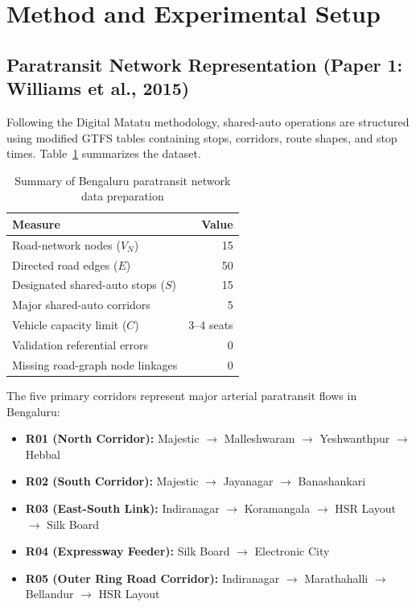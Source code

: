 \section{Method and Experimental Setup}

\subsection{Paratransit Network Representation (Paper 1: Williams et al., 2015)}
Following the Digital Matatu methodology, shared-auto operations are structured using modified GTFS tables containing stops, corridors, route shapes, and stop times. Table~\ref{tab:paratransit-data-summary} summarizes the dataset.

\begin{table}[htbp]
\centering
\caption{Summary of Bengaluru paratransit network data preparation}
\label{tab:paratransit-data-summary}
\begin{tabular}{lr}
\toprule
\textbf{Measure} & \textbf{Value}\\
\midrule
Road-network nodes ($V_N$) & 15\\
Directed road edges ($E$) & 50\\
Designated shared-auto stops ($S$) & 15\\
Major shared-auto corridors & 5\\
Vehicle capacity limit ($C$) & 3--4 seats\\
Validation referential errors & 0\\
Missing road-graph node linkages & 0\\
\bottomrule
\end{tabular}
\end{table}

The five primary corridors represent major arterial paratransit flows in Bengaluru:
\begin{itemize}
\item \textbf{R01 (North Corridor):} Majestic $\rightarrow$ Malleshwaram $\rightarrow$ Yeshwanthpur $\rightarrow$ Hebbal
\item \textbf{R02 (South Corridor):} Majestic $\rightarrow$ Jayanagar $\rightarrow$ Banashankari
\item \textbf{R03 (East-South Link):} Indiranagar $\rightarrow$ Koramangala $\rightarrow$ HSR Layout $\rightarrow$ Silk Board
\item \textbf{R04 (Expressway Feeder):} Silk Board $\rightarrow$ Electronic City
\item \textbf{R05 (Outer Ring Road Corridor):} Indiranagar $\rightarrow$ Marathahalli $\rightarrow$ Bellandur $\rightarrow$ HSR Layout
\end{itemize}


